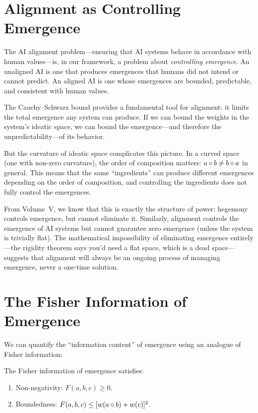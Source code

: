 \section{Alignment as Controlling Emergence}

The AI alignment problem---ensuring that AI systems behave in accordance with
human values---is, in our framework, a problem about \emph{controlling emergence}.
An unaligned AI is one that produces emergences that humans did not intend or
cannot predict. An aligned AI is one whose emergences are bounded, predictable,
and consistent with human values.

\begin{interpretation}
The Cauchy--Schwarz bound provides a fundamental tool for alignment: it limits
the total emergence any system can produce. If we can bound the weights in the
system's ideatic space, we can bound the emergence---and therefore the
unpredictability---of its behavior.

But the curvature of ideatic space complicates this picture. In a curved space
(one with non-zero curvature), the order of composition matters: $a \circ b
\neq b \circ a$ in general. This means that the same ``ingredients'' can
produce different emergences depending on the order of composition, and
controlling the ingredients does not fully control the emergences.

From Volume~V, we know that this is exactly the structure of power: hegemony
controls emergence, but cannot eliminate it. Similarly, alignment controls
the emergence of AI systems but cannot guarantee zero emergence (unless the
system is trivially flat). The mathematical impossibility of eliminating
emergence entirely---the rigidity theorem says you'd need a flat space, which
is a dead space---suggests that alignment will always be an ongoing process
of managing emergence, never a one-time solution.
\end{interpretation}


\section{The Fisher Information of Emergence}

We can quantify the ``information content'' of emergence using an analogue of
Fisher information:

\begin{theorem}
\label{thm:fisher-information}
The Fisher information of emergence satisfies:
\begin{enumerate}
  \item Non-negativity: $F(a, b, c) \geq 0$.
  \item Boundedness: $F(a, b, c) \leq [w(a \circ b) + w(c)]^2$.
\end{enumerate}
\end{theorem}

